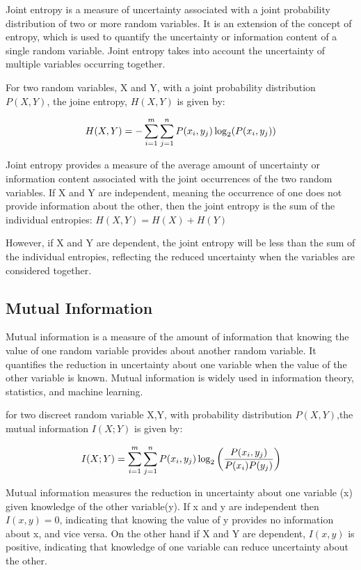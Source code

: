 \documentclass[10pt,a4paper]{article}
\begin{document}
	Joint entropy is a measure of uncertainty associated with a joint probability distribution of two or more random variables. It is an extension of the concept of entropy, which is used to quantify the uncertainty or information content of a single random variable. Joint entropy takes into account the uncertainty of multiple variables occurring together.

	For two random variables, X and Y, with a joint probability distribution $P(X,Y)$,
	the joine entropy, $H(X,Y)$ is given by:

	\begin{align*}
		\large H(X, Y) = -\sum_{i=1}^{m} \sum_{j=1}^{n} P(x_i, y_j) \log_2(P(x_i, y_j))
	\end{align*}

	Joint entropy provides a measure of the average amount of uncertainty or information content associated with the joint occurrences of the two random variables. If X and Y are independent, meaning the occurrence of one does not provide information about the other, then the joint entropy is the sum of the individual entropies:
	$ H(X,Y) = H(X)+H(Y)$

	However, if X and Y are dependent, the joint entropy will be less than the sum of the individual entropies, reflecting the reduced uncertainty when the variables are considered together.

	\subsection{Mutual Information}
	Mutual information is a measure of the amount of information that knowing the value of one random variable provides about another random variable. It quantifies the reduction in uncertainty about one variable when the value of the other variable is known. Mutual information is widely used in information theory, statistics, and machine learning.

	for two discreet random variable X,Y, with probability distribution $P(X,Y)$,the mutual information $I(X;Y)$ is given by:

	\begin{align*}
		\large I(X; Y) = \sum_{i=1}^{m} \sum_{j=1}^{n} P(x_i, y_j) \log_2\left(\frac{P(x_i, y_j)}{P(x_i)P(y_j)}\right)
	\end{align*}

	Mutual information measures the reduction in uncertainty about one variable (x) given knowledge of the other variable(y). If x and y are independent then $I(x,y) = 0$, indicating that knowing the value of y provides no information about x, and vice versa. On the other hand if X and Y are dependent, $I(x,y)$ is positive, indicating that knowledge of one variable can reduce uncertainty about the other.
\end{document}
